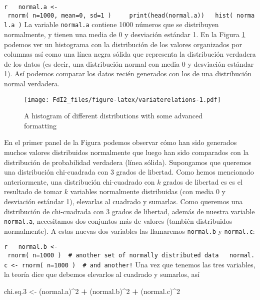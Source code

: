\documentclass[spanish,]{book}
\newenvironment{Shaded}{\begin{snugshade}}{\end{snugshade}}
\newcommand{\DecValTok}[1]{\textcolor[rgb]{0.00,0.00,0.81}{#1}}
\newcommand{\StringTok}[1]{\textcolor[rgb]{0.31,0.60,0.02}{#1}}
\newcommand{\OperatorTok}[1]{\textcolor[rgb]{0.81,0.36,0.00}{\textbf{#1}}}
\newcommand{\NormalTok}[1]{#1}
\begin{document}
\texttt{r\ \ \ normal.a\ \textless{}-\ rnorm(\ n=1000,\ mean=0,\ sd=1\ )\ \ \ \ \ print(head(normal.a))\ \ \ hist(\ normal.a\ )}
La variable \texttt{normal.a} contiene 1000 números que se distribuyen
normalmente, y tienen una media de 0 y desviación estándar 1. En la
Figura \ref{fig:variaterelations} podemos ver un histograma con la
distribución de los valores organizados por columnas así como una línea
negra sólida que representa la distribución verdadera de los datos (es
decir, una distribución normal con media 0 y desviación estándar 1). Así
podemos comparar los datos recién generados con los de una distribución
normal verdadera.

\begin{figure}
\centering
\texttt{[image: FdI2\_files/figure-latex/variaterelations-1.pdf]}
\caption{\label{fig:variaterelations}A histogram of different distributions
with some advanced formatting}
\end{figure}

En el primer panel de la Figura podemos observar cómo han sido generados
muchos valores distribuidos normalmente que luego han sido comparados
con la distribución de probabilidad verdadera (línea sólida). Supongamos
que queremos una distribución chi-cuadrada con 3 grados de libertad.
Como hemos mencionado anteriormente, una distribución chi-cuadrado con
\(k\) grados de libertad es es el resultado de tomar \(k\) variables
normalmente distribuidas (con media 0 y desviación estándar 1),
elevarlas al cuadrado y sumarlas. Como queremos una distribución de
chi-cuadrada con 3 grados de libertad, además de nuestra variable
\texttt{normal.a}, necesitamos dos conjuntos más de valores (también
distribuidos normalmente). A estas nuevas dos variables las llamaremos
\texttt{normal.b} y \texttt{normal.c}:

\texttt{r\ \ \ normal.b\ \textless{}-\ rnorm(\ n=1000\ )\ \ \#\ another\ set\ of\ normally\ distributed\ data\ \ \ normal.c\ \textless{}-\ rnorm(\ n=1000\ )\ \ \#\ and\ another!}
Una vez que tenemos las tres variables, la teoría dice que debemos
elevarlos al cuadrado y sumarlos, así

\begin{Shaded}
\begin{Highlighting}[]
\NormalTok{chi.sq.}\DecValTok{3}\NormalTok{ <-}\StringTok{ }\NormalTok{(normal.a)}\OperatorTok{^}\DecValTok{2} \OperatorTok{+}\StringTok{ }\NormalTok{(normal.b)}\OperatorTok{^}\DecValTok{2} \OperatorTok{+}\StringTok{ }\NormalTok{(normal.c)}\OperatorTok{^}\DecValTok{2}  
\end{Highlighting}
\end{Shaded}
\end{document}

